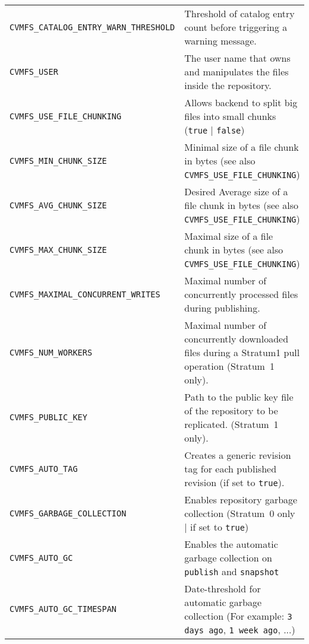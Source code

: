 \begin{longtable}{lX}
		\tt CVMFS\_CATALOG\_ENTRY\_WARN\_THRESHOLD	& Threshold of catalog entry count before triggering a warning message.\\
		\tt CVMFS\_USER						& The user name that owns and manipulates the files inside the repository.\\
		\tt CVMFS\_USE\_FILE\_CHUNKING		& Allows backend to split big files into small chunks (\texttt{true} | \texttt{false})\\
		\tt CVMFS\_MIN\_CHUNK\_SIZE			& Minimal size of a file chunk in bytes \newline (see also \texttt{CVMFS\_USE\_FILE\_CHUNKING})\\
		\tt CVMFS\_AVG\_CHUNK\_SIZE			& Desired Average size of a file chunk in bytes \newline (see also \texttt{CVMFS\_USE\_FILE\_CHUNKING})\\
		\tt CVMFS\_MAX\_CHUNK\_SIZE			& Maximal size of a file chunk in bytes \newline (see also \texttt{CVMFS\_USE\_FILE\_CHUNKING})\\
		\tt CVMFS\_MAXIMAL\_CONCURRENT\_WRITES	& Maximal number of concurrently processed files during publishing.\\
		\tt CVMFS\_NUM\_WORKERS				& Maximal number of concurrently downloaded files during a Stratum1 pull operation (Stratum~1 only).\\
		\tt CVMFS\_PUBLIC\_KEY				& Path to the public key file of the repository to be replicated. (Stratum~1 only).\\
		\tt CVMFS\_AUTO\_TAG					& Creates a generic revision tag for each published revision (if set to \texttt{true}).\\
		\tt CVMFS\_GARBAGE\_COLLECTION		& Enables repository garbage collection \newline (Stratum~0 only | if set to \texttt{true})\\
		\tt CVMFS\_AUTO\_GC					& Enables the automatic garbage collection on \texttt{publish} and \texttt{snapshot}\\
		\tt CVMFS\_AUTO\_GC\_TIMESPAN		& Date-threshold for automatic garbage collection \newline (For example: \texttt{3 days ago}, \texttt{1 week ago}, ...)\\
		\bottomrule
	\end{longtable}
